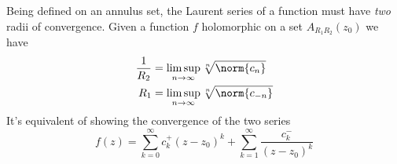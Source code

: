 \documentclass[../mmf.tex]{subfiles}
\begin{document}
\begin{thm}
	Being defined on an annulus set, the Laurent series of a function must have \emph{two} radii of convergence. Given a function $f$ holomorphic on a set $A_{R_1R_2}(z_0)$ we have
	\begin{equation}
		\begin{aligned}
			\frac{1}{R_2}&=\limsup_{n\to\infty}\sqrt[n]{\norm{c_n}}\\
			R_1&=\limsup_{n\to\infty}\sqrt[n]{\norm{c_{-n}}}
		\end{aligned}
		\label{eq:laurentconvergence}
	\end{equation}
	It's equivalent of showing the convergence of the two series
	\begin{equation*}
		f(z)=\sum_{k=0}^{\infty}c_k^+(z-z_0)^k+\sum_{k=1}^{\infty}\frac{c_k^-}{(z-z_0)^k}
	\end{equation*}
\end{thm}
\end{document}
